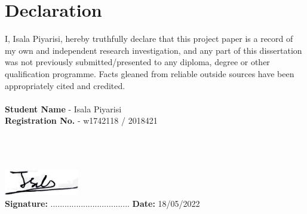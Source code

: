 \chapter*{Declaration}

I, Isala Piyarisi, hereby truthfully declare that this project paper is a record of my own and independent research investigation, and any part of this dissertation was not previously submitted/presented to any diploma, degree or other qualification programme. Facts gleaned from reliable outside sources have been appropriately cited and credited.
\\
\\
\noindent\textbf{Student Name} - Isala Piyarisi \\
\textbf{Registration No.} - w1742118 / 2018421
\\
\\
\\
\\
\begin{spacing}{0}
\hspace*{8px} \includegraphics[height=1.1cm]{assets/signature.png}\\
\textbf{Signature:} ..................................
\hfill 
\textbf{Date:} 18/05/2022
\end{spacing}
